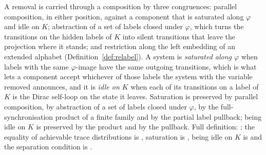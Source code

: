 \begin{definition}
  A removal is carried through a composition by three congruences: parallel composition, in either position, against a component that is saturated along $\varphi$ and idle on $K$; abstraction of a set of labels closed under $\varphi$, which turns the transitions on the hidden labels of $K$ into silent transitions that leave the projection where it stands; and restriction along the left embedding of an extended alphabet (Definition~\ref{def:relabel}).
  A system is \emph{saturated along $\varphi$} when labels with the same $\varphi$-image have the same outgoing transitions, which is what lets a component accept whichever of those labels the system with the variable removed announces, and it is \emph{idle on $K$} when each of its transitions on a label of $K$ is the Dirac self-loop on the state it leaves.
  Saturation is preserved by parallel composition, by abstraction of a set of labels closed under $\varphi$, by the full-synchronisation product of a finite family and by the partial label pullback; being idle on $K$ is preserved by the product and by the pullback.
  Full definition: ; the equality of achievable trace distributions is , saturation is , being idle on $K$ is  and the separation condition is .
\end{definition}
